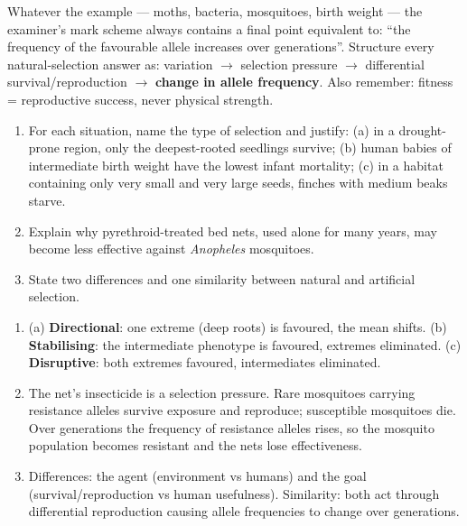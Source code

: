 \documentclass[11pt]{article}
\begin{document}
\begin{attention}
Whatever the example — moths, bacteria, mosquitoes, birth weight — the examiner's mark scheme always contains a final point equivalent to: ``the frequency of the favourable allele increases over generations''. Structure every natural-selection answer as: variation $\rightarrow$ selection pressure $\rightarrow$ differential survival/reproduction $\rightarrow$ \textbf{change in allele frequency}. Also remember: fitness = reproductive success, never physical strength.
\end{attention}

\begin{exercice}
\begin{enumerate}
\item For each situation, name the type of selection and justify: (a) in a drought-prone region, only the deepest-rooted seedlings survive; (b) human babies of intermediate birth weight have the lowest infant mortality; (c) in a habitat containing only very small and very large seeds, finches with medium beaks starve.
\item Explain why pyrethroid-treated bed nets, used alone for many years, may become less effective against \emph{Anopheles} mosquitoes.
\item State two differences and one similarity between natural and artificial selection.
\end{enumerate}
\end{exercice}

\begin{corrige}[Exercise 1]
\begin{enumerate}
\item (a) \textbf{Directional}: one extreme (deep roots) is favoured, the mean shifts. (b) \textbf{Stabilising}: the intermediate phenotype is favoured, extremes eliminated. (c) \textbf{Disruptive}: both extremes favoured, intermediates eliminated.
\item The net's insecticide is a selection pressure. Rare mosquitoes carrying resistance alleles survive exposure and reproduce; susceptible mosquitoes die. Over generations the frequency of resistance alleles rises, so the mosquito population becomes resistant and the nets lose effectiveness.
\item Differences: the agent (environment vs humans) and the goal (survival/reproduction vs human usefulness). Similarity: both act through differential reproduction causing allele frequencies to change over generations.
\end{enumerate}
\end{corrige}
\end{document}
